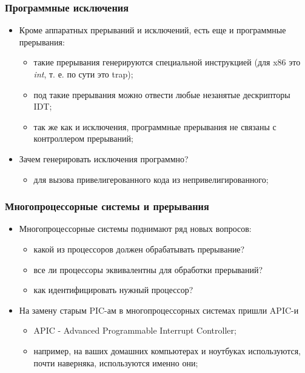 \begin{frame}
\frametitle{Программные исключения}
\begin{itemize}
  \item Кроме аппаратных прерываний и исключений, есть еще и программные
  прерывания:
  \begin{itemize}
    \item такие прерывания генерируются специальной инструкцией (для x86 это
    \emph{int}, т. е. по сути это trap);
    \item под такие прерывания можно отвести любые незанятые дескрипторы IDT;
    \item так же как и исключения, программные прерывания не связаны с
    контроллером прерываний;
  \end{itemize}
  \item Зачем генерировать исключения программно?
  \begin{itemize}
    \item для вызова привелигерованного кода из непривелигированного;
  \end{itemize}
\end{itemize}
\end{frame}

\begin{frame}
\frametitle{Многопроцессорные системы и прерывания}
\begin{itemize}
  \item Многопроцессорные системы поднимают ряд новых вопросов:
  \begin{itemize}
    \item какой из процессоров должен обрабатывать прерывание?
    \item все ли процессоры эквивалентны для обработки прерываний?
    \item как идентифицировать нужный процессор?
  \end{itemize}
  \item На замену старым PIC-ам в многопроцессорных системах пришли APIC-и
  \begin{itemize}
    \item APIC - Advanced Programmable Interrupt Controller;
    \item например, на ваших домашних компьютерах и ноутбуках используются,
    почти наверняка, используются именно они;
  \end{itemize}
\end{itemize}
\end{frame}

